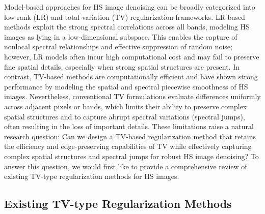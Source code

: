 Model-based approaches for HS image denoising can be broadly categorized into low-rank (LR) and total variation (TV) regularization frameworks. LR-based methods exploit the strong spectral correlations across all bands, modeling HS images as lying in a low-dimensional subspace. This enables the capture of nonlocal spectral relationships and effective suppression of random noise; however, LR models often incur high computational cost and may fail to preserve fine spatial details, especially when strong spatial structures are present. In contrast, TV-based methods are computationally efficient and have shown strong performance by modeling the spatial and spectral piecewise smoothness of HS images. Nevertheless, conventional TV formulations evaluate differences uniformly across adjacent pixels or bands, which limits their ability to preserve complex spatial structures and to capture abrupt spectral variations (spectral jumps), often resulting in the loss of important details. These limitations raise a natural research question: Can we design a TV-based regularization method that retains the efficiency and edge-preserving capabilities of TV while effectively capturing complex spatial structures and spectral jumps for robust HS image denoising? To answer this question, we would first like to provide a comprehensive review of existing TV-type regularization methods for HS images.


\subsection{Existing TV-type Regularization Methods}
\label{sec:existing_tv_methods}



